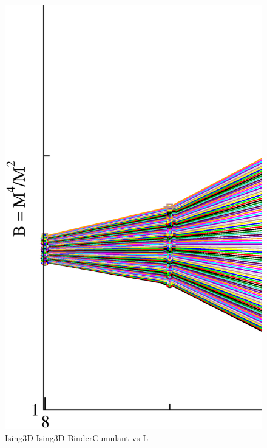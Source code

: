 \begin{figure}[!htpb]
  \centering
  \includegraphics[width=\textwidth]{./plots/Ising3D/Ising3D_BinderCumulant_vs_L.eps}
  \caption{Ising3D Ising3D BinderCumulant vs L}
\end{figure}

